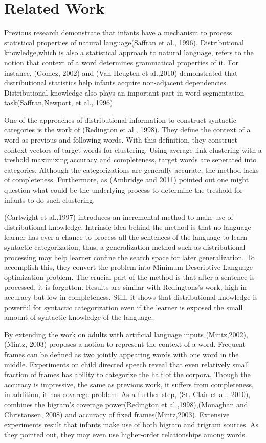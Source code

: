 \section{Related Work}
Previous research demonstrate that infants have a mechanism to process
statistical properties of natural language(Saffran et al., 1996).
Distributional knowledge,which is also a statistical approach to natural
language, refers to the notion that context of a word determines grammatical
properties of it. For instance, (Gomez, 2002) and (Van Heugten et al.,2010)
demonstrated that distributional statistics help infants acquire non-adjacent
dependencies. Distributional knowledge also plays an important part in word
segmentation task(Saffran,Newport, et al., 1996).

One of the approaches of distributional information to construct syntactic
categories is the work of (Redington et al., 1998). They define the context of
a word as previous and following words. With this definition, they construct
context vectors of target words for clustering. Using average link clustering
with a treshold maximizing accuracy and completeness, target  words are
seperated into categories. Although the categorizations are generally accurate,
the method lacks of completeness. Furthermore, as (Ambridge  and 2011) pointed
out one might question what could be the underlying process to determine the
treshold for infants to do such clustering.

(Cartwight et al.,1997) introduces an incremental method to make use of
distributional knowledge. Intrinsic idea behind the method is that no language
learner has ever a chance to process all the sentences of the language to learn
syntactic categorization, thus, a generalization method such as distributional
processing may help learner confine the search space for later generalization.
To accomplish this, they convert the problem into Minimum Descriptive Language
optimization problem. The crucial part of the method is that after a sentence
is processed, it is forgotton. Results are similar with Redingtons's work, high
in accuracy but low in completeness. Still, it shows that distributional
knowledge is powerful for syntactic categorization even if the learner is
exposed the small amount of syntactic knowledge of the language.

By extending the work on adults with artificial language inputs (Mintz,2002),
(Mintz, 2003) proposes a notion to represent the context of a word. Frequent
frames can be defined as two jointly appearing words with one word in the
middle. Experiments on child directed speech reveal that even relatively small
fraction of frames has ability to categorize the half of the corpora. Though
the accuracy is impressive, the same as previous work, it suffers from
completeness, in addition, it has covarege problem. As a further step, (St.
Clair et al., 2010), combines the bigram's coverage power(Redington et
al.,1998),(Monaghan and Christansen, 2008) and accuracy of fixed
frames(Mintz,2003). Extensive experiments result that infants make use of both
bigram and trigram sources. As they pointed out, they may even use higher-order
relationships among words. 


